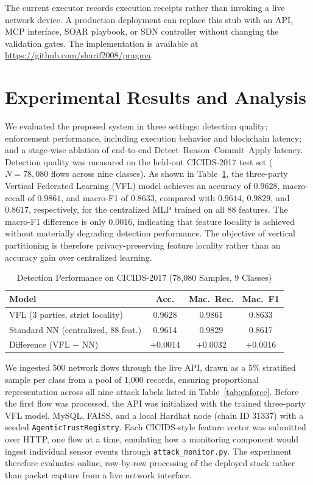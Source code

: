 \documentclass[10pt, conference]{IEEEtran}
\begin{document}
The current executor records execution receipts rather than invoking a live network device. A production deployment can replace this stub with an API, MCP interface, SOAR playbook, or SDN controller without changing the validation gates. The implementation is available at
\url{https://github.com/sharif2008/pragma}.




\section{Experimental Results and Analysis} \label{sec:results}
We evaluated the proposed system in three settings: detection quality; enforcement performance, including execution behavior and blockchain latency; and a stage-wise ablation of end-to-end Detect--Reason--Commit--Apply latency. Detection quality was measured on the held-out CICIDS-2017 test set ($N{=}78{,}080$ flows across nine classes). As shown in Table~\ref{tab:vfl}, the three-party Vertical Federated Learning (VFL) model achieves an accuracy of $0.9628$, macro-recall of $0.9861$, and macro-F1 of $0.8633$, compared with $0.9614$, $0.9829$, and $0.8617$, respectively, for the centralized MLP trained on all $88$ features. The macro-F1 difference is only $0.0016$, indicating that feature locality is achieved without materially degrading detection performance. The objective of vertical partitioning is therefore privacy-preserving feature locality rather than an accuracy gain over centralized learning.

\begin{table}[t]
\centering
\caption{Detection Performance on CICIDS-2017 (78{,}080 Samples, 9 Classes)}
\label{tab:vfl}
\renewcommand{\arraystretch}{1.2}
\begin{tabular}{@{}lccc@{}}
\toprule
\textbf{Model} & \textbf{Acc.} & \textbf{Mac.\ Rec.} & \textbf{Mac.\ F1}\\
\midrule
VFL (3 parties, strict locality)    & 0.9628 & 0.9861 & 0.8633\\
Standard NN (centralized, 88 feat.) & 0.9614 & 0.9829 & 0.8617\\
\midrule
Difference (VFL $-$ NN)             & +0.0014 & +0.0032 & +0.0016\\
\bottomrule
\end{tabular}
\end{table}


We ingested 500 network flows through the live API, drawn as a 5\% stratified sample per class from a pool of 1{,}000 records, ensuring proportional representation across all nine attack labels listed in Table~\ref{tab:enforce}. Before the first flow was processed, the API was initialized with the trained three-party VFL model, MySQL, FAISS, and a local Hardhat node (chain ID $31337$) with a seeded \texttt{AgenticTrustRegistry}. Each CICIDS-style feature vector was submitted over HTTP, one flow at a time, emulating how a monitoring component would ingest individual sensor events through \texttt{attack\_monitor.py}. The experiment therefore evaluates online, row-by-row processing of the deployed stack rather than packet capture from a live network interface.
\end{document}
